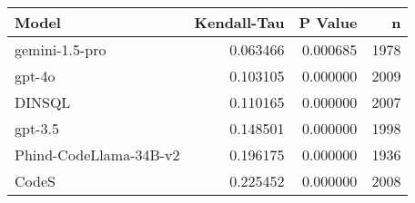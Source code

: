 \begin{tabular}{lrrr}
\toprule
Model & Kendall-Tau & P Value & n \\
\midrule
gemini-1.5-pro & 0.063466 & 0.000685 & 1978 \\
gpt-4o & 0.103105 & 0.000000 & 2009 \\
DINSQL & 0.110165 & 0.000000 & 2007 \\
gpt-3.5 & 0.148501 & 0.000000 & 1998 \\
Phind-CodeLlama-34B-v2 & 0.196175 & 0.000000 & 1936 \\
CodeS & 0.225452 & 0.000000 & 2008 \\
\bottomrule
\end{tabular}
